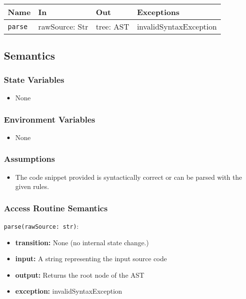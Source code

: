 \documentclass[12pt, titlepage]{article}
\begin{document}
\begin{center}
\begin{tabular}{p{5cm} p{3.5cm} p{3.5cm} p{2cm}}
\hline
\textbf{Name} & \textbf{In} & \textbf{Out} & \textbf{Exceptions} \\
\hline
\texttt{parse} & rawSource: Str & tree: AST  & invalidSyntaxException \\
\hline
\end{tabular}
\end{center}

\subsection{Semantics}

\subsubsection{State Variables}

\begin{itemize}
    \item None
\end{itemize}

\subsubsection{Environment Variables}

\begin{itemize}
  \item None
\end{itemize}

\subsubsection{Assumptions}

\begin{itemize}
    \item The code snippet provided is syntactically correct or can be parsed with the given rules.
\end{itemize}

\subsubsection{Access Routine Semantics}

\noindent \texttt{parse(rawSource: str)}:
\begin{itemize}
    \item \textbf{transition:} None (no internal state change.)
    \item \textbf{input:} A string representing the input source code
    \item \textbf{output:} Returns the root node of the AST
    \item \textbf{exception:} invalidSyntaxException
\end{itemize}
\end{document}
